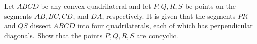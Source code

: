 Let $ABCD$ be any convex quadrilateral and let $P, Q, R, S$ be points on the segments $AB, BC, CD$, and $DA$, respectively. It is given that the segments $PR$ and $QS$ dissect $ABCD$ into four quadrilaterals, each of which has perpendicular diagonals. Show that the points $P, Q, R, S$ are concyclic.